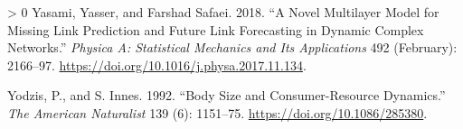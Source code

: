 \documentclass[10pt,oneside]{article}
\newlength{\cslhangindent}
\newenvironment{CSLReferences}[3] %
 {%
  \setlength{\parindent}{0pt}
  \ifodd #1 \everypar{\setlength{\hangindent}{\cslhangindent}}\ignorespaces\fi
  \ifnum #2 > 0
  \setlength{\parskip}{#2\baselineskip}
  \fi
 }%
 {}
\begin{document}
\begin{CSLReferences}{1}{0}
\leavevmode\hypertarget{ref-Yasami2018NovMul}{}%
Yasami, Yasser, and Farshad Safaei. 2018. {``A Novel Multilayer Model
for Missing Link Prediction and Future Link Forecasting in Dynamic
Complex Networks.''} \emph{Physica A: Statistical Mechanics and Its
Applications} 492 (February): 2166--97.
\url{https://doi.org/10.1016/j.physa.2017.11.134}.

\leavevmode\hypertarget{ref-Yodzis1992BodSiz}{}%
Yodzis, P., and S. Innes. 1992. {``Body Size and Consumer-Resource
Dynamics.''} \emph{The American Naturalist} 139 (6): 1151--75.
\url{https://doi.org/10.1086/285380}.

\end{CSLReferences}
\end{document}
